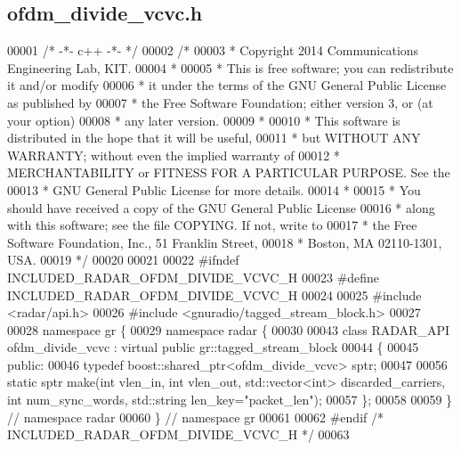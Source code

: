 \subsection{ofdm\+\_\+divide\+\_\+vcvc.\+h}
\label{ofdm__divide__vcvc_8h_source}

\begin{DoxyCode}
00001 \textcolor{comment}{/* -*- c++ -*- */}
00002 \textcolor{comment}{/* }
00003 \textcolor{comment}{ * Copyright 2014 Communications Engineering Lab, KIT.}
00004 \textcolor{comment}{ * }
00005 \textcolor{comment}{ * This is free software; you can redistribute it and/or modify}
00006 \textcolor{comment}{ * it under the terms of the GNU General Public License as published by}
00007 \textcolor{comment}{ * the Free Software Foundation; either version 3, or (at your option)}
00008 \textcolor{comment}{ * any later version.}
00009 \textcolor{comment}{ * }
00010 \textcolor{comment}{ * This software is distributed in the hope that it will be useful,}
00011 \textcolor{comment}{ * but WITHOUT ANY WARRANTY; without even the implied warranty of}
00012 \textcolor{comment}{ * MERCHANTABILITY or FITNESS FOR A PARTICULAR PURPOSE.  See the}
00013 \textcolor{comment}{ * GNU General Public License for more details.}
00014 \textcolor{comment}{ * }
00015 \textcolor{comment}{ * You should have received a copy of the GNU General Public License}
00016 \textcolor{comment}{ * along with this software; see the file COPYING.  If not, write to}
00017 \textcolor{comment}{ * the Free Software Foundation, Inc., 51 Franklin Street,}
00018 \textcolor{comment}{ * Boston, MA 02110-1301, USA.}
00019 \textcolor{comment}{ */}
00020 
00021 
00022 \textcolor{preprocessor}{#ifndef INCLUDED\_RADAR\_OFDM\_DIVIDE\_VCVC\_H}
00023 \textcolor{preprocessor}{#define INCLUDED\_RADAR\_OFDM\_DIVIDE\_VCVC\_H}
00024 
00025 \textcolor{preprocessor}{#include <radar/api.h>}
00026 \textcolor{preprocessor}{#include <gnuradio/tagged\_stream\_block.h>}
00027 
00028 \textcolor{keyword}{namespace }gr \{
00029   \textcolor{keyword}{namespace }radar \{
00030 
00043     \textcolor{keyword}{class }RADAR_API ofdm_divide_vcvc : \textcolor{keyword}{virtual} \textcolor{keyword}{public} gr::tagged\_stream\_block
00044     \{
00045      \textcolor{keyword}{public}:
00046       \textcolor{keyword}{typedef} boost::shared\_ptr<ofdm\_divide\_vcvc> sptr;
00047 
00056       \textcolor{keyword}{static} sptr make(\textcolor{keywordtype}{int} vlen\_in, \textcolor{keywordtype}{int} vlen\_out, std::vector<int> discarded\_carriers, \textcolor{keywordtype}{int} num\_sync\_words, 
      std::string len\_key=\textcolor{stringliteral}{"packet\_len"});
00057     \};
00058 
00059   \} \textcolor{comment}{// namespace radar}
00060 \} \textcolor{comment}{// namespace gr}
00061 
00062 \textcolor{preprocessor}{#endif }\textcolor{comment}{/* INCLUDED\_RADAR\_OFDM\_DIVIDE\_VCVC\_H */}\textcolor{preprocessor}{}
00063 
\end{DoxyCode}
